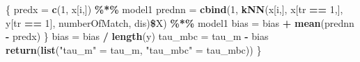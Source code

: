\documentclass[]{article}
\newenvironment{Shaded}{\begin{snugshade}}{\end{snugshade}}
\newcommand{\KeywordTok}[1]{\textcolor[rgb]{0.13,0.29,0.53}{\textbf{#1}}}
\newcommand{\DecValTok}[1]{\textcolor[rgb]{0.00,0.00,0.81}{#1}}
\newcommand{\StringTok}[1]{\textcolor[rgb]{0.31,0.60,0.02}{#1}}
\newcommand{\OperatorTok}[1]{\textcolor[rgb]{0.81,0.36,0.00}{\textbf{#1}}}
\newcommand{\NormalTok}[1]{#1}
\begin{document}
\begin{Shaded}
\begin{Highlighting}[]
\NormalTok{  \{}
\NormalTok{    predx =}\StringTok{ }\KeywordTok{c}\NormalTok{(}\DecValTok{1}\NormalTok{, x[i,]) }\OperatorTok{\%*\%}\StringTok{ }\NormalTok{model1}
\NormalTok{    prednn =}\StringTok{ }\KeywordTok{cbind}\NormalTok{(}\DecValTok{1}\NormalTok{, }\KeywordTok{kNN}\NormalTok{(x[i,], x[tr }\OperatorTok{==}\StringTok{ }\DecValTok{1}\NormalTok{,], y[tr }\OperatorTok{==}\StringTok{ }\DecValTok{1}\NormalTok{], numberOfMatch, dis)}\OperatorTok{\$}\NormalTok{X) }\OperatorTok{\%*\%}\StringTok{ }\NormalTok{model1}
\NormalTok{    bias =}\StringTok{ }\NormalTok{bias }\OperatorTok{+}\StringTok{ }\KeywordTok{mean}\NormalTok{(prednn }\OperatorTok{-}\StringTok{ }\NormalTok{predx)}
\NormalTok{  \}}
\NormalTok{  bias =}\StringTok{ }\NormalTok{bias }\OperatorTok{/}\StringTok{ }\KeywordTok{length}\NormalTok{(y)}
\NormalTok{  tau_mbc =}\StringTok{ }\NormalTok{tau_m }\OperatorTok{-}\StringTok{ }\NormalTok{bias}
  \KeywordTok{return}\NormalTok{(}\KeywordTok{list}\NormalTok{(}\StringTok{"tau_m"}\NormalTok{ =}\StringTok{ }\NormalTok{tau_m, }\StringTok{"tau_mbc"}\NormalTok{ =}\StringTok{ }\NormalTok{tau_mbc))}
\NormalTok{\}}
\end{Highlighting}
\end{Shaded}
\end{document}
